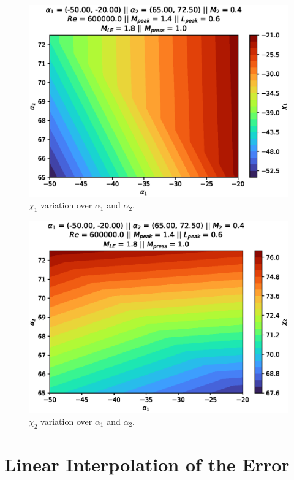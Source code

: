 \begin{figure}[!ht]
    \centering
    \includegraphics[scale=0.7]{figures/interpolation/alpha1alpha2metalIn.eps}
    \caption{$\chi_1$ variation over $\alpha_1$ and $\alpha_2$.}
\end{figure}

\begin{figure}[!ht]
    \centering
    \includegraphics[scale=0.7]{figures/interpolation/alpha1alpha2metalOut.eps}
    \caption{$\chi_2$ variation over $\alpha_1$ and $\alpha_2$.}
\end{figure}

\clearpage

\section{Linear Interpolation of the Error}

